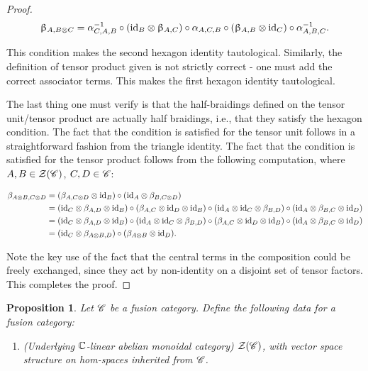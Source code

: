 \documentclass{article}
\newtheorem{proposition}{Proposition}[section]
\theoremstyle{definition}
\numberwithin{figure}{section}
\begin{document}
\begin{enumerate}[\thesection .1.]
\begin{proof}
$$\upbeta_{A,B\otimes C}=\alpha_{C,A,B}^{-1}\circ \left(\mathrm{id}_{B}\otimes \upbeta_{A,C}\right)\circ \alpha_{A,C,B}\circ\left(\upbeta_{A,B}\otimes \mathrm{id}_C\right)\circ \alpha^{-1}_{A,B,C}.$$

This condition makes the second hexagon identity tautological. Similarly, the definition of tensor product given is not strictly correct - one must add the correct associator terms. This makes the first hexagon identity tautological.

The last thing one must verify is that the half-braidings defined on the tensor unit/tensor product are actually half braidings, i.e., that they satisfy the hexagon condition. The fact that the condition is satisfied for the tensor unit follows in a straightforward fashion from the triangle identity. The fact that the condition is satisfied for the tensor product follows from the following computation, where $A,B\in \mathcal{Z}(\mathscr{C})$, $C,D\in \mathscr{C}$:

\begin{align*}
\beta_{A\otimes B,C\otimes D}&=(\beta_{A,C\otimes D}\otimes \mathrm{id}_{B})\circ (\mathrm{id}_{A}\otimes \beta_{B,C\otimes D})\\
&=(\mathrm{id}_{C}\otimes \beta_{A,D}\otimes \mathrm{id}_{B})\circ (\beta_{A,C}\otimes \mathrm{id}_{D}\otimes \mathrm{id}_{B})\circ (\mathrm{id}_{A}\otimes \mathrm{id}_{C}\otimes \beta_{B,D})\circ (\mathrm{id}_{A}\otimes \beta_{B,C}\otimes \mathrm{id}_{D})\\
&=(\mathrm{id}_{C}\otimes \beta_{A,D}\otimes \mathrm{id}_{B})\circ (\mathrm{id}_{A}\otimes \mathrm{id}_{C}\otimes \beta_{B,D})\circ (\beta_{A,C}\otimes \mathrm{id}_{D}\otimes \mathrm{id}_{B})\circ (\mathrm{id}_{A}\otimes \beta_{B,C}\otimes \mathrm{id}_{D})\\
&=(\mathrm{id}_{C}\otimes \beta_{A\otimes B,D})\circ (\beta_{A\otimes B}\otimes \mathrm{id}_{D}).
\end{align*}

Note the key use of the fact that the central terms in the composition could be freely exchanged, since they act by non-identity on a disjoint set of tensor factors. This completes the proof.

\end{proof}

\begin{proposition} Let $\mathscr{C}$ be a fusion category. Define the following data for a fusion category:

\begin{enumerate}
\item (Underlying $\mathbb{C}$-linear abelian monoidal category) $\mathcal{Z}(\mathscr{C})$, with vector space structure on hom-spaces inherited from $\mathscr{C}$.


\end{enumerate}
\end{proposition}
\end{enumerate}
\end{document}
